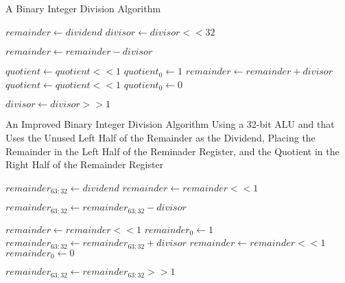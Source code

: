 \documentclass[11pt]{article}
\begin{document}
\begin{algorithm}[hbt!]
\caption{A Binary Integer Division Algorithm}\label{alg:div1}
\begin{algorithmic}

\State $remainder \gets dividend$
\State $divisor \gets divisor << 32$

    \State $remainder \gets remainder - divisor$
    
        \State $quotient \gets quotient << 1$
        \State $quotient_{0} \gets 1$
    \Else
        \State $remainder \gets remainder + divisor$
        \State $quotient \gets quotient << 1$
        \State $quotient_{0} \gets 0$    
    \EndIf
    
    \State $divisor \gets divisor >> 1$
\EndFor

\end{algorithmic}
\end{algorithm}

\pagebreak

\begin{algorithm}[hbt!]
\caption{An Improved Binary Integer Division Algorithm Using a 32-bit ALU and that Uses the Unused Left Half of the Remainder as the Dividend, Placing the Remainder in the Left Half of the Reminader Register, and the Quotient in the Right Half of the Remainder Register}\label{alg:div1}
\begin{algorithmic}

\State $remainder_{63:32} \gets dividend$
\State $remainder \gets remainder << 1$

    \State $remainder_{63:32} \gets remainder_{63:32} - divisor$
    
        \State $remainder \gets remainder << 1$
        \State $remainder_{0} \gets 1$
    \Else
        \State $remainder_{63:32} \gets remainder_{63:32} + divisor$
        \State $remainder \gets remainder << 1$
        \State $remainder_{0} \gets 0$    
    \EndIf
    
    \State $remainder_{63:32} \gets remainder_{63:32} >> 1$
\EndFor

\end{algorithmic}
\end{algorithm}
\end{document}
